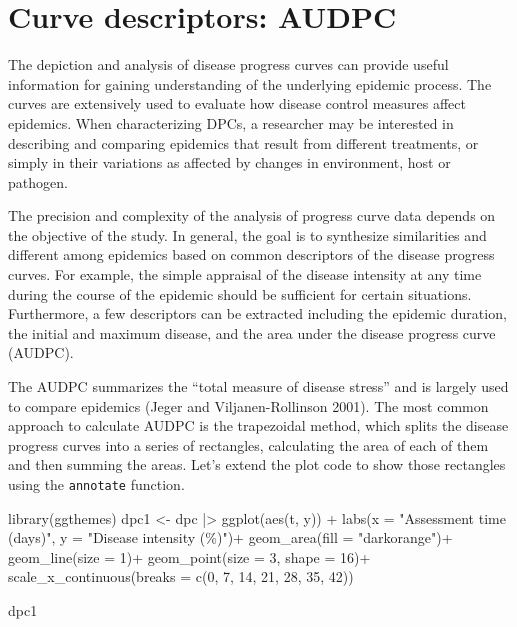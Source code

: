 \documentclass[
  letterpaper,
  DIV=11,
  numbers=noendperiod]{scrreprt}
\newenvironment{Shaded}{\begin{snugshade}}{\end{snugshade}}
\newcommand{\AttributeTok}[1]{\textcolor[rgb]{0.40,0.45,0.13}{#1}}
\newcommand{\DecValTok}[1]{\textcolor[rgb]{0.68,0.00,0.00}{#1}}
\newcommand{\FunctionTok}[1]{\textcolor[rgb]{0.28,0.35,0.67}{#1}}
\newcommand{\NormalTok}[1]{\textcolor[rgb]{0.00,0.23,0.31}{#1}}
\newcommand{\OtherTok}[1]{\textcolor[rgb]{0.00,0.23,0.31}{#1}}
\newcommand{\SpecialCharTok}[1]{\textcolor[rgb]{0.37,0.37,0.37}{#1}}
\newcommand{\StringTok}[1]{\textcolor[rgb]{0.13,0.47,0.30}{#1}}
\begin{document}
\hypertarget{curve-descriptors-audpc}{%
\section{Curve descriptors: AUDPC}\label{curve-descriptors-audpc}}

The depiction and analysis of disease progress curves can provide useful
information for gaining understanding of the underlying epidemic
process. The curves are extensively used to evaluate how disease control
measures affect epidemics. When characterizing DPCs, a researcher may be
interested in describing and comparing epidemics that result from
different treatments, or simply in their variations as affected by
changes in environment, host or pathogen.

The precision and complexity of the analysis of progress curve data
depends on the objective of the study. In general, the goal is to
synthesize similarities and different among epidemics based on common
descriptors of the disease progress curves. For example, the simple
appraisal of the disease intensity at any time during the course of the
epidemic should be sufficient for certain situations. Furthermore, a few
descriptors can be extracted including the epidemic duration, the
initial and maximum disease, and the area under the disease progress
curve (AUDPC).

The AUDPC summarizes the ``total measure of disease stress'' and is
largely used to compare epidemics (Jeger and Viljanen-Rollinson 2001).
The most common approach to calculate AUDPC is the trapezoidal method,
which splits the disease progress curves into a series of rectangles,
calculating the area of each of them and then summing the areas. Let's
extend the plot code to show those rectangles using the
\texttt{annotate} function.

\begin{Shaded}
\begin{Highlighting}[]
\FunctionTok{library}\NormalTok{(ggthemes)}
\NormalTok{dpc1 }\OtherTok{\textless{}{-}}\NormalTok{ dpc }\SpecialCharTok{|\textgreater{}}
  \FunctionTok{ggplot}\NormalTok{(}\FunctionTok{aes}\NormalTok{(t, y)) }\SpecialCharTok{+}
  \FunctionTok{labs}\NormalTok{(}\AttributeTok{x =} \StringTok{"Assessment time (days)"}\NormalTok{,}
       \AttributeTok{y =} \StringTok{"Disease intensity (\%)"}\NormalTok{)}\SpecialCharTok{+}
    \FunctionTok{geom\_area}\NormalTok{(}\AttributeTok{fill =} \StringTok{"darkorange"}\NormalTok{)}\SpecialCharTok{+}
    \FunctionTok{geom\_line}\NormalTok{(}\AttributeTok{size =} \DecValTok{1}\NormalTok{)}\SpecialCharTok{+}
  \FunctionTok{geom\_point}\NormalTok{(}\AttributeTok{size =} \DecValTok{3}\NormalTok{, }\AttributeTok{shape =} \DecValTok{16}\NormalTok{)}\SpecialCharTok{+}
  \FunctionTok{scale\_x\_continuous}\NormalTok{(}\AttributeTok{breaks =} \FunctionTok{c}\NormalTok{(}\DecValTok{0}\NormalTok{, }\DecValTok{7}\NormalTok{, }\DecValTok{14}\NormalTok{, }\DecValTok{21}\NormalTok{, }\DecValTok{28}\NormalTok{, }\DecValTok{35}\NormalTok{, }\DecValTok{42}\NormalTok{))}

\NormalTok{dpc1}
\end{Highlighting}
\end{Shaded}
\end{document}
